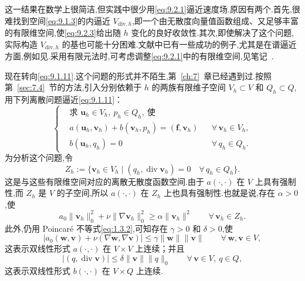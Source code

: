 这一结果在数学上很简洁,但实践中很少用\eqref{eq:9.2.1}逼近速度场.原因有两个.首先,很难找到空间\eqref{eq:9.1.3}的内逼近 \(V_{\mathrm{div},h}\),即一个由无散度向量值函数组成、又足够丰富的有限维空间,使\eqref{eq:9.2.3}给出随 \(h\) 变化的良好收敛性.其次,即使解决了这个问题,实际构造 \(V_{\mathrm{div},h}\) 的基也可能十分困难.文献中已有一些成功的例子,尤其是在谱逼近方面,例如见.采用有限元法时,可考虑调整\eqref{eq:9.2.1}中的有限维空间,见笔记~.

现在转向\eqref{eq:9.1.11}.这个问题的形式并不陌生,第~\ref{ch:7}~章已经遇到过.按照第~\ref{sec:7.4}~节的方法,引入分别依赖于 \(h\) 的两族有限维子空间 \(V_h\subset V\) 和 \(Q_h\subset Q\),用下列离散问题逼近\eqref{eq:9.1.11}：
\begin{equation}\label{eq:9.2.4}
  \left\{
  \begin{aligned}
    &\text{求 }\boldsymbol{u}_h\in V_h,\ p_h\in Q_h,\ \text{使}\\
    &a(\boldsymbol{u}_h,\boldsymbol{v}_h)+b(\boldsymbol{v}_h,p_h)=(\boldsymbol{f},\boldsymbol{v}_h)
        &&\forall\,\boldsymbol{v}_h\in V_h,\\
    &b(\boldsymbol{u}_h,q_h)=0&&\forall\,q_h\in Q_h.
  \end{aligned}
  \right.
\end{equation}
为分析这个问题,令
\begin{equation}\label{eq:9.2.5}
  Z_h:=\{\boldsymbol{v}_h\in V_h\mid (q_h,\operatorname{div}\boldsymbol{v}_h)=0
      \quad\forall\,q_h\in Q_h\}.
\end{equation}
这是与这些有限维空间对应的离散无散度函数空间.由于 \(a(\cdot,\cdot)\) 在 \(V\) 上具有强制性,而 \(Z_h\) 是 \(V\) 的子空间,所以 \(a(\cdot,\cdot)\) 在 \(Z_h\) 上也具有强制性.也就是说,存在 \(\alpha>0\),使
\begin{equation}\label{eq:9.2.6}
  a_0\|\boldsymbol{v}_h\|_0^2+\nu\|\nabla\boldsymbol{v}_h\|_0^2\ge\alpha\|\boldsymbol{v}_h\|^2
    \qquad\forall\,\boldsymbol{v}_h\in Z_h.
\end{equation}
此外,仍用 Poincaré 不等式\eqref{eq:1.3.2},可知存在 \(\gamma>0\) 和 \(\delta>0\),使
\begin{equation}\label{eq:9.2.7}
  |a_0(\boldsymbol{w},\boldsymbol{v})+\nu(\nabla\boldsymbol{w},\nabla\boldsymbol{v})|
      \le\gamma\|\boldsymbol{w}\|\|\boldsymbol{v}\|\qquad\forall\,\boldsymbol{w},\boldsymbol{v}\in V,
\end{equation}
这表示双线性形式 \(a(\cdot,\cdot)\) 在 \(V\times V\) 上连续；并且
\begin{equation}\label{eq:9.2.8}
  |(q,\operatorname{div}\boldsymbol{v})|\le\delta\|\boldsymbol{v}\|\|q\|_0
      \qquad\forall\,\boldsymbol{v}\in V,\ q\in Q,
\end{equation}
这表示双线性形式 \(b(\cdot,\cdot)\) 在 \(V\times Q\) 上连续.

